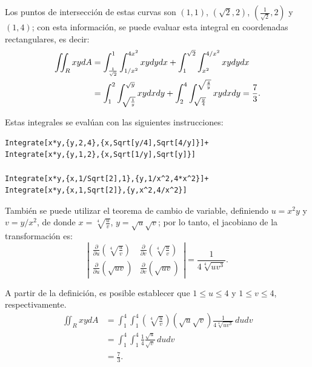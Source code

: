 \begin{parrafonumerado}
Los puntos de intersección de estas curvas son $\left( 1,1\right) $, $\left( \sqrt{2},2\right) $,
$\left( \frac{1}{\sqrt{2}},2\right) $ y $\left( 1,4\right)$; con esta información, se puede evaluar esta integral en coordenadas rectangulares, es decir:
\begin{gather*}
\begin{aligned}
\displaystyle \iint_R xy dA &= \int_{\frac{1}{\sqrt{2}}}^{1}\int_{1/x^{2}}^{4x^{2}}xydydx+\int_{1}^{\sqrt{2}}\int_{x^{2}}^{4/x^{2}}xydydx \\
&= \int_{1}^{2}\int_{\sqrt{\frac{1}{y}}}^{\sqrt{y}}xydxdy+\int_{2}^{4}\int_{\sqrt{\frac{y}{4}}}^{\sqrt{\frac{4}{y}}}xydxdy =\frac{7}{3}.
\end{aligned}
\end{gather*}

Estas integrales se evalúan con las siguientes instrucciones:

\begin{tcolorbox}[title=\bf Instrucción en \verb"Mathematica"]\begin{Verbatim}[formatcom=\letraverbatim]
Integrate[x*y,{y,2,4},{x,Sqrt[y/4],Sqrt[4/y]}]+
Integrate[x*y,{y,1,2},{x,Sqrt[1/y],Sqrt[y]}]

Integrate[x*y,{x,1/Sqrt[2],1},{y,1/x^2,4*x^2}]+
Integrate[x*y,{x,1,Sqrt[2]},{y,x^2,4/x^2}]
\end{Verbatim}
\end{tcolorbox}

También se puede utilizar el teorema de cambio de variable, definiendo $u=x^{2}y$ y $v=y/x^{2}$, de donde $x=\sqrt[4]{\frac{u}{v}}$, $y=\sqrt{u}\sqrt{v}$; por lo tanto, el jacobiano de la transformación es:
\[\left|
\begin{array}{cc} \frac{\partial }{\partial u}\left( \sqrt[4]{\frac{u}{v}}\right) & \frac{\partial }{\partial v}\left( \sqrt[4]{\frac{u}{v}}\right) \\[0.1cm]
\frac{\partial }{\partial u}\left( \sqrt{uv}\right) & \frac{\partial }{\partial v}\left( \sqrt{uv}\right)
\end{array} \right| = \frac{1}{4\sqrt[4]{uv^{3}}}.\]

A partir de la definición, es posible establecer que $1\leq u \leq 4$ y $1\leq v \leq 4$, respectivamente.
\begin{align*}
\iint_R xy dA &= \int_{1}^{4}\int_{1}^{4}\left( \sqrt[4]{\frac{u}{v}}\right) \left( \sqrt{u}\sqrt{v}\right) \frac{1}{4\sqrt[4]{uv^{3}}}\, dudv\\
&=\int_{1}^{4}\int_{1}^{4}\frac{1}{4}\frac{\sqrt{u}}{\sqrt{v}}\, dudv\\
&= \frac{7}{3}.
\end{align*}


\end{parrafonumerado}
